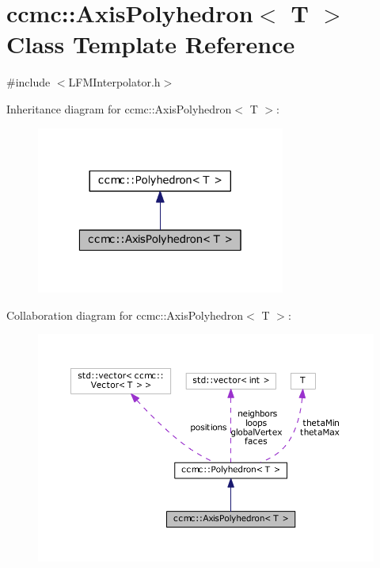 \hypertarget{classccmc_1_1_axis_polyhedron}{\section{ccmc\-:\-:Axis\-Polyhedron$<$ T $>$ Class Template Reference}
\label{classccmc_1_1_axis_polyhedron}
}


{\ttfamily \#include $<$L\-F\-M\-Interpolator.\-h$>$}



Inheritance diagram for ccmc\-:\-:Axis\-Polyhedron$<$ T $>$\-:
\nopagebreak
\begin{figure}[H]
\begin{center}
\leavevmode
\includegraphics[width=232pt]{classccmc_1_1_axis_polyhedron__inherit__graph}
\end{center}
\end{figure}


Collaboration diagram for ccmc\-:\-:Axis\-Polyhedron$<$ T $>$\-:
\nopagebreak
\begin{figure}[H]
\begin{center}
\leavevmode
\includegraphics[width=350pt]{classccmc_1_1_axis_polyhedron__coll__graph}
\end{center}
\end{figure}
